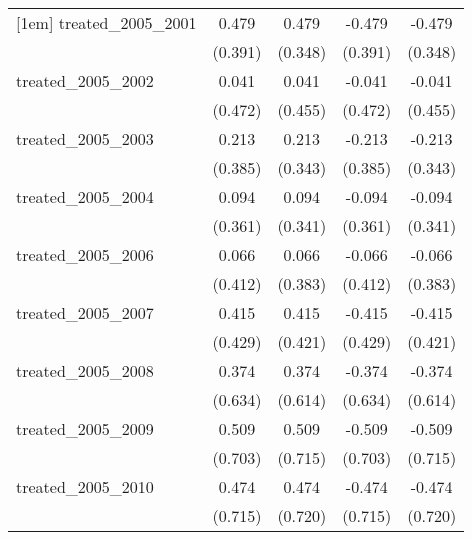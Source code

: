 {\begin{tabular}{l*{4}{c}}
[1em]
treated\_2005\_2001&       0.479         &       0.479         &      -0.479         &      -0.479         \\
            &     (0.391)         &     (0.348)         &     (0.391)         &     (0.348)         \\
[1em]
treated\_2005\_2002&       0.041         &       0.041         &      -0.041         &      -0.041         \\
            &     (0.472)         &     (0.455)         &     (0.472)         &     (0.455)         \\
[1em]
treated\_2005\_2003&       0.213         &       0.213         &      -0.213         &      -0.213         \\
            &     (0.385)         &     (0.343)         &     (0.385)         &     (0.343)         \\
[1em]
treated\_2005\_2004&       0.094         &       0.094         &      -0.094         &      -0.094         \\
            &     (0.361)         &     (0.341)         &     (0.361)         &     (0.341)         \\
[1em]
treated\_2005\_2006&       0.066         &       0.066         &      -0.066         &      -0.066         \\
            &     (0.412)         &     (0.383)         &     (0.412)         &     (0.383)         \\
[1em]
treated\_2005\_2007&       0.415         &       0.415         &      -0.415         &      -0.415         \\
            &     (0.429)         &     (0.421)         &     (0.429)         &     (0.421)         \\
[1em]
treated\_2005\_2008&       0.374         &       0.374         &      -0.374         &      -0.374         \\
            &     (0.634)         &     (0.614)         &     (0.634)         &     (0.614)         \\
[1em]
treated\_2005\_2009&       0.509         &       0.509         &      -0.509         &      -0.509         \\
            &     (0.703)         &     (0.715)         &     (0.703)         &     (0.715)         \\
[1em]
treated\_2005\_2010&       0.474         &       0.474         &      -0.474         &      -0.474         \\
            &     (0.715)         &     (0.720)         &     (0.715)         &     (0.720)         \\

\end{tabular}}
